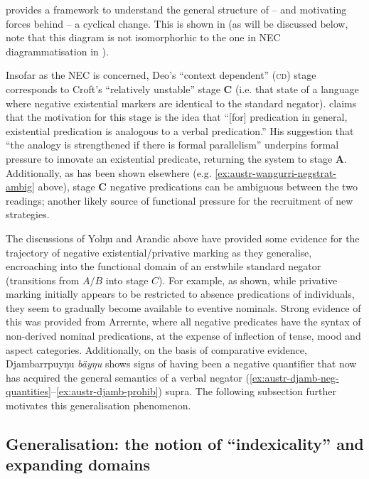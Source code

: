 \documentclass[output=paper,draft,draftmode,colorlinks,citecolor=brown]{langscibook}
\begin{document}
\citet{Deo2015a} provides a framework to understand the general structure of -- and motivating forces behind -- a cyclical change. This is shown in  (as will be discussed below, note that this diagram is not isomorphorhic to the one in NEC diagrammatisation in ).

Insofar as the NEC is concerned, Deo's ``context dependent'' (\textsc{cd}) stage corresponds to Croft's ``relatively unstable'' stage \textbf{C} (i.e. that state of a language where negative existential markers are identical to the standard negator). \citet[19]{Croft1991} claims that the motivation for this stage is the idea that ``[for] predication in general, existential predication is analogous to a verbal predication.'' His suggestion that ``the analogy is strengthened if there is formal parallelism'' underpins formal pressure to innovate an existential predicate, returning the system to stage \textbf{A}. Additionally, as has been shown elsewhere (e.g. \ref{ex:austr-wangurri-negstrat-ambig} above), stage \textbf{C} negative predications can be ambiguous between the two readings; another likely source of functional pressure for the recruitment of new strategies.

The discussions of Yolŋu and Arandic above have provided some evidence for
    the trajectory of negative existential\slash privative marking as they
    generalise, encroaching into the functional domain of an erstwhile
    standard negator (transitions from $A/B$ into stage $C$). For example,
    as shown, while privative marking initially appears to be restricted to
    absence predications of individuals, they seem to gradually become
    available to eventive nominals. Strong evidence of this was provided
    from Arrernte, where all negative predicates have the syntax of
    non-derived nominal predications, at the expense of inflection of
    tense, mood and aspect categories. Additionally, on the basis of
    comparative evidence, Djambarrpuyŋu \textit{bäyŋu} shows signs of
    having been a negative quantifier that now has acquired the general
    semantics of a verbal negator (\ref{ex:austr-djamb-neg-quantities}--\ref{ex:austr-djamb-prohib}) supra. The following subsection further motivates this generalisation phenomenon. 

\subsection{Generalisation: the notion of ``indexicality'' and expanding domains}
\end{document}
